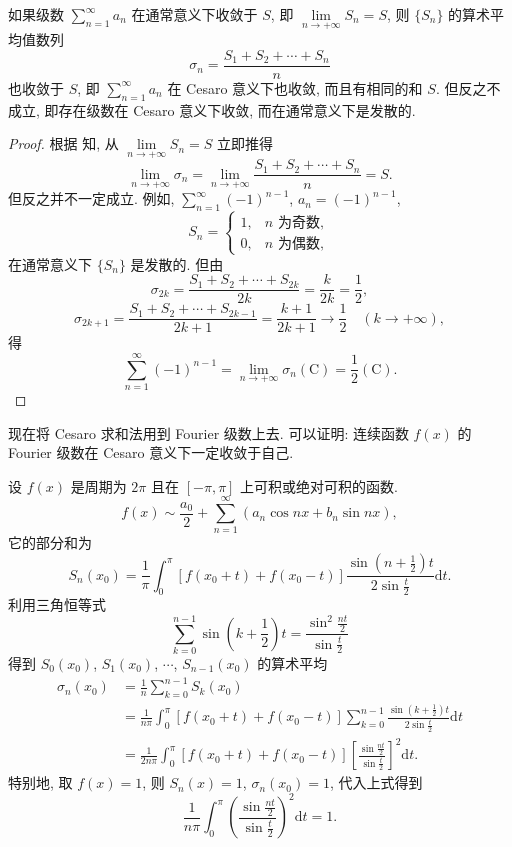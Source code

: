 \begin{theorem}\label{thm:16.4.1}
如果级数 $\displaystyle\sum_{n=1}^{\infty}a_{n}$ 在通常意义下收敛于 $S$, 即 $\lim\limits_{n\to+\infty}S_{n}=S$, 则 $\{S_{n}\}$ 的算术平均值数列
\[
  \sigma_{n}=\frac{S_{1}+S_{2}+\cdots+S_{n}}{n}
\]
也收敛于 $S$, 即 $\displaystyle\sum_{n=1}^{\infty}a_{n}$ 在 Cesaro 意义下也收敛, 而且有相同的和 $S$. 但反之不成立, 即存在级数在 Cesaro 意义下收敛, 而在通常意义下是发散的.
\end{theorem}

\begin{proof}
根据 知, 从 $\lim\limits_{n\to+\infty}S_{n}=S$ 立即推得
\[
  \lim_{n\to+\infty}\sigma_{n}=\lim_{n\to+\infty}\frac{S_{1}+S_{2}+\cdots+S_{n}}{n}=S.
\]
但反之并不一定成立. 例如, $\displaystyle\sum_{n=1}^{\infty}(-1)^{n-1}$, $a_{n}=(-1)^{n-1}$,
\[
  S_{n}=\begin{cases}
    1,&n\text{ 为奇数},\\
    0,&n\text{ 为偶数},
\end{cases}
\]
在通常意义下 $\{S_{n}\}$ 是发散的. 但由
\[
  \sigma_{2k}=\frac{S_{1}+S_{2}+\cdots+S_{2k}}{2k}=\frac{k}{2k}=\frac{1}{2},
\]
\[
  \sigma_{2k+1}=\frac{S_{1}+S_{2}+\cdots+S_{2k-1}}{2k+1}=\frac{k+1}{2k+1}\to\frac{1}{2}\quad(k\to+\infty),
\]
得
\[
  \sum_{n=1}^{\infty}(-1)^{n-1}=\lim_{n\to+\infty}\sigma_{n}(\mathrm{C})=\frac{1}{2}(\mathrm{C}).
\]
\end{proof}

现在将 Cesaro 求和法用到 Fourier 级数上去. 可以证明: 连续函数 $f(x)$ 的 Fourier 级数在 Cesaro 意义下一定收敛于自己.

设 $f(x)$ 是周期为 $2\pi$ 且在 $[-\pi,\pi]$ 上可积或绝对可积的函数.
\[
  f(x)\sim\frac{a_{0}}{2}+\sum_{n=1}^{\infty}\left(a_{n}\cos nx+b_{n}\sin nx\right),
\]
它的部分和为
\[
  S_{n}(x_{0})=\frac{1}{\pi}\int_{0}^{\pi}\left[f(x_{0}+t)+f(x_{0}-t)\right]\frac{\sin\left(n+\frac{1}{2}\right)t}{2\sin\frac{t}{2}}\mathrm{d}t.
\]
利用三角恒等式
\[
  \sum_{k=0}^{n-1}\sin\left(k+\frac{1}{2}\right)t=\frac{\sin^{2}\frac{nt}{2}}{\sin\frac{t}{2}}
\]
得到 $S_{0}(x_{0})$, $S_{1}(x_{0})$, $\cdots$, $S_{n-1}(x_{0})$ 的算术平均
\begin{align*}
  \sigma_{n}(x_{0})&=\frac{1}{n}\sum_{k=0}^{n-1}S_{k}(x_{0})\\
  &=\frac{1}{n\pi}\int_{0}^{\pi}\left[f(x_{0}+t)+f(x_{0}-t)\right]\sum_{k=0}^{n-1}\frac{\sin\left(k+\frac{1}{2}\right)t}{2\sin\frac{t}{2}}\mathrm{d}t\\
  &=\frac{1}{2n\pi}\int_{0}^{\pi}\left[f(x_{0}+t)+f(x_{0}-t)\right]\left[\frac{\sin\frac{nt}{2}}{\sin\frac{t}{2}}\right]^{2}\mathrm{d}t.
\end{align*}
特别地, 取 $f(x)=1$, 则 $S_{n}(x)=1$, $\sigma_{n}(x_{0})=1$, 代入上式得到
\[
  \frac{1}{n\pi}\int_{0}^{\pi}\left(\frac{\sin\frac{nt}{2}}{\sin\frac{t}{2}}\right)^{2}\mathrm{d}t=1.
\]

